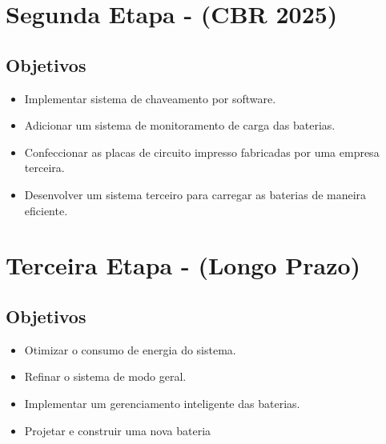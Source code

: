 \documentclass[12pt]{article}
\begin{document}
\section{Segunda Etapa - (CBR 2025)}

\subsection{Objetivos}
\begin{itemize}
	\item Implementar sistema de chaveamento por software.
	\item Adicionar um sistema de monitoramento de carga das baterias.
	\item Confeccionar as placas de circuito impresso fabricadas por uma empresa terceira.
	\item Desenvolver um sistema terceiro para carregar as baterias de maneira eficiente.
\end{itemize}

\section{Terceira Etapa - (Longo Prazo)}

\subsection{Objetivos}
\begin{itemize}
	\item Otimizar o consumo de energia do sistema.
	\item Refinar o sistema de modo geral.
	\item Implementar um gerenciamento inteligente das baterias.
	\item Projetar e construir uma nova bateria
\end{itemize}
\end{document}
